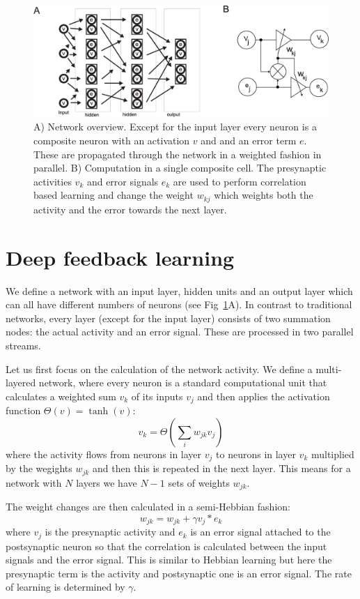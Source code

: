 \documentclass{llncs}
\begin{document}
\begin{figure}[h!]
  \centering
  \includegraphics[width=\columnwidth]{netw_together}
  \caption{A) Network overview. Except for the input layer
    every neuron is a composite neuron with an activation $v$ and
    and an error term $e$. These are propagated through the network
    in a weighted fashion in parallel.
B) Computation in a single composite cell.
    The presynaptic activities $v_k$ and error signals $e_k$ are used
    to perform correlation based learning and change the weight $w_{kj}$
    which weights both the activity and the error towards the next
    layer.\label{netw_together}}
\end{figure}


\section{Deep feedback learning}
We define a network with an input layer, hidden units and an output
layer which can all have different numbers of neurons (see
Fig~\ref{netw_together}A). In contrast to traditional
networks, every layer (except for the input layer) consists of two
summation nodes: the actual activity and an error signal. These
are processed in two parallel streams.

Let us first focus on the calculation of the network activity. We
define a multi-layered network, where every neuron is a standard
computational unit that calculates a weighted sum $v_k$ of its inputs $v_j$ and
then applies the activation function $\Theta(v) = \tanh(v)$:
\begin{equation}
  v_k = \Theta\left( \sum_i w_{jk} v_{j} \right) \label{act_sum}
\end{equation}
where the activity flows from neurons in layer $v_j$ to neurons in
layer $v_k$ multiplied by the wegights $w_{jk}$ and then this
is repeated in the next layer. This means for a network with
$N$ layers we have $N-1$ sets of weights $w_{jk}$.

The weight changes are then calculated in a semi-Hebbian fashion:
\begin{equation}
  w_{jk} = w_{jk} + \gamma v_j * e_k \label{learningRule}
\end{equation}
where $v_j$ is the presynaptic activity and $e_k$ is an error signal
attached to the postsynaptic neuron so that the correlation is
calculated between the input signals and the error signal.  This is
similar to Hebbian learning but here the presynaptic term is the
activity and postsynaptic one is an error signal. The rate of
learning is determined by $\gamma$.
\end{document}
